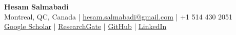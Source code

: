 \documentclass[10pt, a4paper]{article}
\begin{document}

\begin{center}
  {\LARGE\bfseries\color{headingblue} Hesam Salmabadi}\\[4pt]
  {\small
    Montreal, QC, Canada \quad|\quad
    \href{mailto:hesam.salmabadi@gmail.com}{hesam.salmabadi@gmail.com} \quad|\quad
    +1 514 430 2051 \\[2pt]
    \href{https://scholar.google.com/citations?user=QAvXX3cAAAAJ}{Google Scholar} \quad|\quad
    \href{https://www.researchgate.net/profile/Hesam-Salmabadi}{ResearchGate} \quad|\quad
    \href{https://github.com/hesam-salmabadi}{GitHub} \quad|\quad
    \href{https://www.linkedin.com/in/hesam-salmabadi/}{LinkedIn}
  }
\end{center}

\vspace{4pt}




\end{document}
